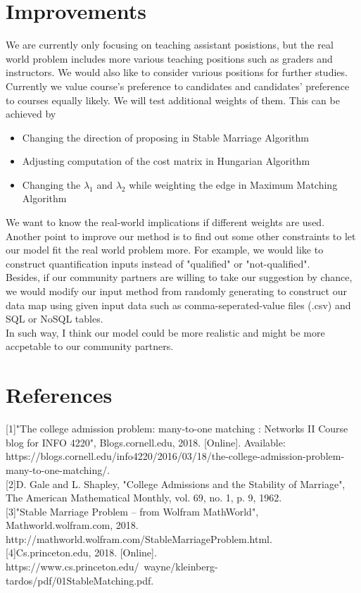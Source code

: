 \documentclass[twoside,twocolumn]{article}
\begin{document}
    \section{Improvements}
    We are currently only focusing on teaching assistant posistions, but the real world problem includes more various teaching
    positions such as graders and instructors. We would also like to consider various positions for further studies.
    \\ \indent Currently we value course's preference to candidates and candidates' preference to courses equally likely. We will
    test additional weights of them. This can be achieved by
    \begin{itemize}
        \item Changing the direction of proposing in Stable Marriage Algorithm
        \item Adjusting computation of the cost matrix in Hungarian Algorithm
        \item Changing the $\lambda_1$ and $\lambda_2$ while weighting the edge in Maximum Matching Algorithm
    \end{itemize}
    We want to know the real-world implications if different weights are used.
    \\ \indent Another point to improve our method is to find out some other constraints to let our model fit the real world problem more. For example,
    we would like to construct quantification inputs instead of "qualified" or "not-qualified".
    \\ \indent Besides, if our community partners are willing to take our suggestion by chance, we would modify our input method from
    randomly generating to construct our data map using given input data such as comma-seperated-value files (.csv) and 
    SQL or NoSQL tables.
    \\ \indent In such way, I think our model could be more realistic and might be more accpetable to our community partners.
    \section{References}
    [1]"The college admission problem: many-to-one matching : Networks II Course blog for INFO 4220", Blogs.cornell.edu, 2018. [Online]. 
    Available: https://blogs.cornell.edu/info4220/2016/03/18/the-college-admission-problem-many-to-one-matching/. \\

    [2]D. Gale and L. Shapley, "College Admissions and the Stability of Marriage", The American Mathematical Monthly, vol. 69, no. 1, p. 9, 1962. \\
    
    [3]"Stable Marriage Problem -- from Wolfram MathWorld", Mathworld.wolfram.com, 2018. http://mathworld.wolfram.com/StableMarriageProblem.html. \\
    
    [4]Cs.princeton.edu, 2018. [Online]. https://www.cs.princeton.edu/~wayne/kleinberg-tardos/pdf/01StableMatching.pdf. \\
    
\end{document}
